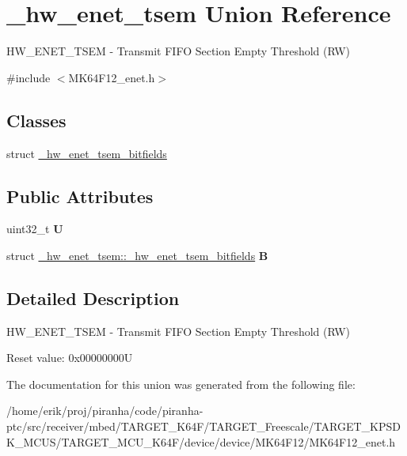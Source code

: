 \hypertarget{union__hw__enet__tsem}{}\section{\+\_\+hw\+\_\+enet\+\_\+tsem Union Reference}
\label{union__hw__enet__tsem}


H\+W\+\_\+\+E\+N\+E\+T\+\_\+\+T\+S\+EM -\/ Transmit F\+I\+FO Section Empty Threshold (RW)  




{\ttfamily \#include $<$M\+K64\+F12\+\_\+enet.\+h$>$}

\subsection*{Classes}
\begin{DoxyCompactItemize}
\item 
struct \hyperlink{struct__hw__enet__tsem_1_1__hw__enet__tsem__bitfields}{\+\_\+hw\+\_\+enet\+\_\+tsem\+\_\+bitfields}
\end{DoxyCompactItemize}
\subsection*{Public Attributes}
\begin{DoxyCompactItemize}
\item 
uint32\+\_\+t {\bfseries U}\hypertarget{union__hw__enet__tsem_a94d5c2aab73948c3cd993b5b3f94003b}{}\label{union__hw__enet__tsem_a94d5c2aab73948c3cd993b5b3f94003b}

\item 
struct \hyperlink{struct__hw__enet__tsem_1_1__hw__enet__tsem__bitfields}{\+\_\+hw\+\_\+enet\+\_\+tsem\+::\+\_\+hw\+\_\+enet\+\_\+tsem\+\_\+bitfields} {\bfseries B}\hypertarget{union__hw__enet__tsem_abea08d82ef8563607416185acaa88b4f}{}\label{union__hw__enet__tsem_abea08d82ef8563607416185acaa88b4f}

\end{DoxyCompactItemize}


\subsection{Detailed Description}
H\+W\+\_\+\+E\+N\+E\+T\+\_\+\+T\+S\+EM -\/ Transmit F\+I\+FO Section Empty Threshold (RW) 

Reset value\+: 0x00000000U 

The documentation for this union was generated from the following file\+:\begin{DoxyCompactItemize}
\item 
/home/erik/proj/piranha/code/piranha-\/ptc/src/receiver/mbed/\+T\+A\+R\+G\+E\+T\+\_\+\+K64\+F/\+T\+A\+R\+G\+E\+T\+\_\+\+Freescale/\+T\+A\+R\+G\+E\+T\+\_\+\+K\+P\+S\+D\+K\+\_\+\+M\+C\+U\+S/\+T\+A\+R\+G\+E\+T\+\_\+\+M\+C\+U\+\_\+\+K64\+F/device/device/\+M\+K64\+F12/M\+K64\+F12\+\_\+enet.\+h\end{DoxyCompactItemize}
